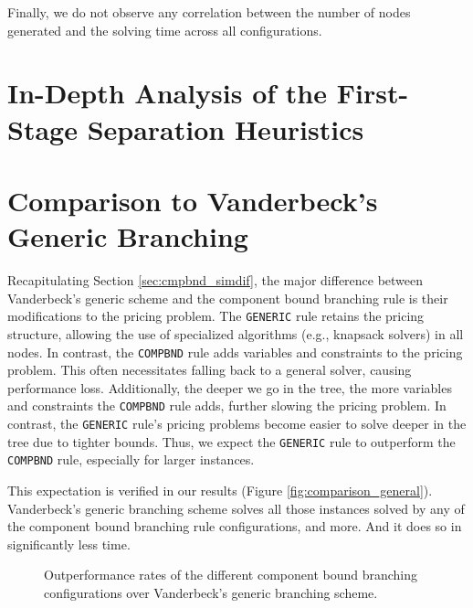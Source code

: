 Finally, we do not observe any correlation between the number of nodes generated and the solving time across all configurations.

\section{In-Depth Analysis of the First-Stage Separation Heuristics}\label{sec:evaluation_comparison_separation_firststage}

\section{Comparison to Vanderbeck's Generic Branching}\label{sec:evaluation_comparison_generic}
Recapitulating Section \ref{sec:cmpbnd_simdif}, the major difference between Vanderbeck's generic scheme and the component bound branching rule is their modifications to the pricing problem. The \texttt{GENERIC} rule retains the pricing structure, allowing the use of specialized algorithms (e.g., knapsack solvers) in all nodes. In contrast, the \texttt{COMPBND} rule adds variables and constraints to the pricing problem. This often necessitates falling back to a general \MIP{} solver, causing performance loss. Additionally, the deeper we go in the tree, the more variables and constraints the \texttt{COMPBND} rule adds, further slowing the pricing problem. In contrast, the \texttt{GENERIC} rule's pricing problems become easier to solve deeper in the tree due to tighter bounds. Thus, we expect the \texttt{GENERIC} rule to outperform the \texttt{COMPBND} rule, especially for larger instances.

This expectation is verified in our results (Figure \ref{fig:comparison_general}). Vanderbeck's generic branching scheme solves all those instances solved by any of the component bound branching rule configurations, and more. And it does so in significantly less time.

\begin{figure}
	\centering

	\begin{subfigure}{0.49\textwidth}
		\centering
		
	\end{subfigure}
	\hfill
	\begin{subfigure}{0.49\textwidth}
		\centering
		
	\end{subfigure}

	\caption{Outperformance rates of the different component bound branching configurations over Vanderbeck's generic branching scheme.}
	\label{fig:comparison_outperform}
\end{figure}


